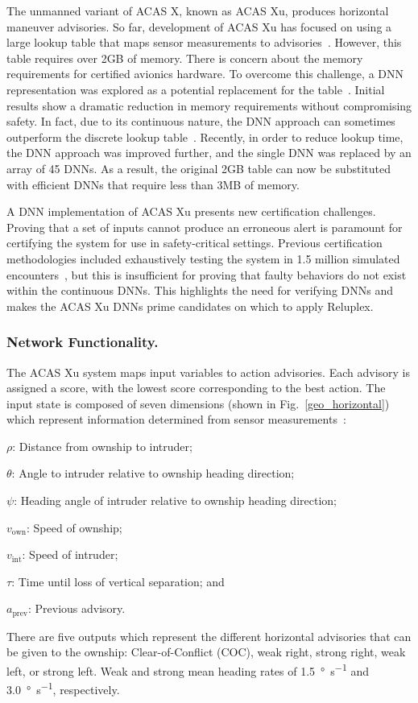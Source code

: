 \documentclass[a4paper]{llncs}
\begin{document}
The unmanned variant of ACAS X, known as ACAS Xu, produces horizontal
maneuver advisories. So far, development of ACAS Xu has focused on using a 
large lookup table that maps sensor measurements to advisories~\cite{JuLoBrOwKo16}. However, this 
table requires over 2GB of memory. There is concern about the memory requirements
for certified avionics hardware. To
overcome this challenge, a DNN representation was explored as a potential replacement for the 
table~\cite{JuLoBrOwKo16}. Initial results show a dramatic reduction
in memory requirements without compromising safety. In fact, due to
its continuous nature, the DNN approach can sometimes outperform 
the discrete lookup table~\cite{JuLoBrOwKo16}. 
Recently, in order to reduce lookup time, the DNN approach was
improved further, and the single DNN was replaced by an array of 45 DNNs.
As a result, the original 2GB table can now be substituted with
 efficient DNNs that require less than 3MB of memory. 

A DNN implementation of ACAS Xu presents new certification challenges.
Proving that a set of inputs cannot
produce an erroneous alert is paramount for certifying the system for
use in safety-critical settings.
 Previous certification methodologies
 included exhaustively testing the system in 1.5 million simulated
 encounters~\cite{Kochenderfer2010jgcd}, but this is insufficient for proving that faulty behaviors do not exist
within the continuous DNNs. 
This highlights the need for verifying DNNs and
makes the ACAS Xu DNNs prime candidates on which 
to apply Reluplex.



\subsubsection{Network Functionality.} 
The ACAS Xu system maps input variables to action advisories. Each advisory is assigned a score,
with the lowest score corresponding to the best action.
The input state is composed of seven dimensions (shown
in Fig.~\ref{geo_horizontal}) which represent information 
determined from sensor measurements~\cite{Kochenderfer2011atc371}: 
\begin{inparaenum}[(i)]
	\item $\rho$: Distance from ownship to intruder;
	\item $\theta$: Angle to intruder relative to ownship heading direction;
	\item $\psi$: Heading angle of intruder relative to ownship heading direction;
	\item $v_\text{own}$: Speed of ownship;
	\item $v_\text{int}$: Speed of intruder;
	\item $\tau$: Time until loss of vertical separation; and
	\item $a_\text{prev}$: Previous advisory.
\end{inparaenum}
There are five outputs which represent the different horizontal
advisories that can be given to the ownship: Clear-of-Conflict (COC),
weak right, strong right, weak left, or strong left.
Weak and strong mean heading rates of \SI{1.5}{\degree\per\second} and \SI{3.0}{\degree\per\second}, respectively.
\end{document}

